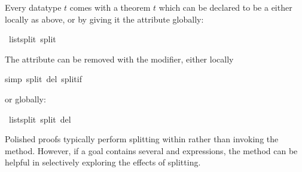 \begin{isabellebody}
\begin{isamarkuptext}
Every datatype $t$ comes with a theorem
$t$ which can be declared to be a  either
locally as above, or by giving it the  attribute globally:%
\end{isamarkuptext}%
\isamarkuptrue%
\isamarkupfalse%
\ list{\isachardot}split\ {\isacharbrackleft}split{\isacharbrackright}%
\begin{isamarkuptext}%
\noindent
The  attribute can be removed with the  modifier,
either locally%
\end{isamarkuptext}%
\isamarkuptrue%
%
\isadelimproof
%
\endisadelimproof
%
\isatagproof
{}\isamarkupfalse%
{\isacharparenleft}simp\ split\ del{\isacharcolon}\ split{\isacharunderscore}if{\isacharparenright}%
\endisatagproof
{\isafoldproof}%
%
\isadelimproof
%
\endisadelimproof
%
\begin{isamarkuptext}%
\noindent
or globally:%
\end{isamarkuptext}%
\isamarkuptrue%
\isamarkupfalse%
\ list{\isachardot}split\ {\isacharbrackleft}split\ del{\isacharbrackright}%
\begin{isamarkuptext}%
Polished proofs typically perform splitting within  rather than 
invoking the  method.  However, if a goal contains
several  and  expressions, 
the  method can be
helpful in selectively exploring the effects of splitting.


\end{isamarkuptext}
\end{isabellebody}
